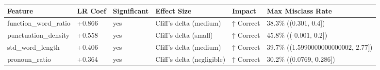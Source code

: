 \begin{tabular}{llllll}
\toprule
Feature & LR Coef & Significant & Effect Size & Impact & Max Misclass Rate \\
\midrule
function\_word\_ratio & +0.866 & yes & Cliff's delta (medium) & ↑ Correct & 38.3\% ((0.301, 0.4]) \\
punctuation\_density & +0.558 & yes & Cliff's delta (small) & ↑ Correct & 45.8\% ((-0.001, 0.2]) \\
std\_word\_length & +0.406 & yes & Cliff's delta (medium) & ↑ Correct & 39.7\% ((1.5990000000000002, 2.77]) \\
pronoun\_ratio & +0.364 & yes & Cliff's delta (negligible) & ↑ Correct & 30.2\% ((0.0769, 0.286]) \\
\bottomrule
\end{tabular}

